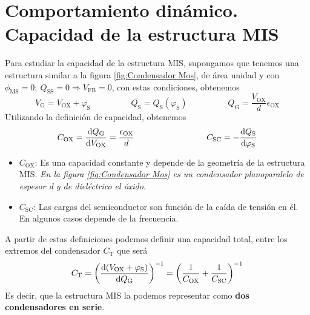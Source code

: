 \section{Comportamiento dinámico. Capacidad de la estructura MIS}
Para estudiar la capacidad de la estructura MIS, supongamos que tenemos una estructura similar a la figura \ref{fig:Condensador Mos}, de área unidad y con $\phi_\mathrm{MS}=0; \ Q_\mathrm{SS}=0 \Rightarrow V_\mathrm{FB}=0$, con estas condiciones, obtenemos $$V_\mathrm{G}=V_\mathrm{OX}+\varphi_\mathrm{S} \hspace{2cm}
Q_\mathrm{S}=Q_\mathrm{S}(\varphi_\mathrm{S}) \hspace{2cm} 
Q_\mathrm{G}=\frac{V_\mathrm{OX}}{d}\epsilon_\mathrm{OX}$$
Utilizando la definición de capacidad, obtenemos
\begin{equation}
    C_\mathrm{OX}=\diff[]{Q_\mathrm{G}}{V_\mathrm{OX}}=\frac{\epsilon_\mathrm{OX}}{d} \hspace{3cm} C_\mathrm{SC}=-\diff[]{Q_\mathrm{S}}{\varphi_\mathrm{S}}
\end{equation}
\newpage
\begin{itemize}
    \item $C_\mathrm{OX}$: Es una capacidad constante y depende de la geometría de la estructura MIS. \textit{En la figura \ref{fig:Condensador Mos} es un condensador planoparalelo de espesor d y de dieléctrico el óxido}.
    \item $C_\mathrm{SC}$: Las cargas del semiconductor son función de la caída de tensión en él. En algunos casos depende de la frecuencia.
\end{itemize}
A partir de estas definiciones podemos definir una capacidad total, entre los extremos del condensador $C_\mathrm{T}$ que será
\begin{equation}
    C_\mathrm{T}=\left(\diff[]{(V_\mathrm{OX}+\varphi_\mathrm{S})}{Q_\mathrm{G}} \right)^{-1}=\left(\frac{1}{C_\mathrm{OX}}+\frac{1}{C_\mathrm{SC}} \right)^{-1}
\end{equation}
Es decir, que la estructura MIS la podemos representar como \textbf{dos condensadores en serie}.
